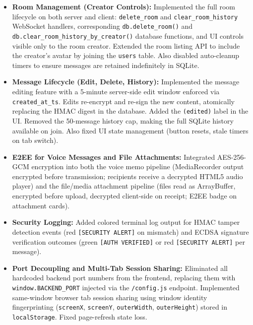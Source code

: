 \documentclass[12pt, a4paper]{article}
\begin{document}
\begin{itemize}[leftmargin=*]
    \item \textbf{Room Management (Creator Controls):} Implemented the full room lifecycle on both server and client: \texttt{delete\_room} and \texttt{clear\_room\_history} WebSocket handlers, corresponding \texttt{db.delete\_room()} and \texttt{db.clear\_room\_history\_by\_creator()} database functions, and UI controls visible only to the room creator. Extended the room listing API to include the creator's avatar by joining the \texttt{users} table. Also disabled auto-cleanup timers to ensure messages are retained indefinitely in SQLite.

    \item \textbf{Message Lifecycle (Edit, Delete, History):} Implemented the message editing feature with a 5-minute server-side edit window enforced via \texttt{created\_at\_ts}. Edits re-encrypt and re-sign the new content, atomically replacing the HMAC digest in the database. Added the \texttt{(edited)} label in the UI. Removed the 50-message history cap, making the full SQLite history available on join. Also fixed UI state management (button resets, stale timers on tab switch).

    \item \textbf{E2EE for Voice Messages and File Attachments:} Integrated AES-256-GCM encryption into both the voice memo pipeline (MediaRecorder output encrypted before transmission; recipients receive a decrypted HTML5 audio player) and the file/media attachment pipeline (files read as ArrayBuffer, encrypted before upload, decrypted client-side on receipt; E2EE badge on attachment cards).

    \item \textbf{Security Logging:} Added colored terminal log output for HMAC tamper detection events (red \texttt{[SECURITY ALERT]} on mismatch) and ECDSA signature verification outcomes (green \texttt{[AUTH VERIFIED]} or red \texttt{[SECURITY ALERT]} per message).

    \item \textbf{Port Decoupling and Multi-Tab Session Sharing:} Eliminated all hardcoded backend port numbers from the frontend, replacing them with \texttt{window.BACKEND\_PORT} injected via the \texttt{/config.js} endpoint. Implemented same-window browser tab session sharing using window identity fingerprinting (\texttt{screenX}, \texttt{screenY}, \texttt{outerWidth}, \texttt{outerHeight}) stored in \texttt{localStorage}. Fixed page-refresh state loss.
\end{itemize}
\end{document}

